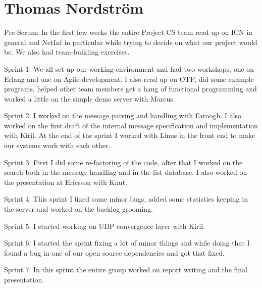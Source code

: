 \section{Thomas Nordstr\"om}

Pre-Scrum:
In the first few weeks the entire Project CS team read up on ICN in general and NetInf in particular while trying to decide on what our project would be. We also had team-building exercises.

Sprint 1:
We all set up our working environment and had two workshops, one on Erlang and one on Agile development. I also read up on OTP, did some example programs, helped other team members get a hang of functional programming and worked a little on the simple demo server with Marcus.

Sprint 2:
I worked on the message parsing and handling with Faroogh. I also worked on the first draft of the internal message specification and implementation with Kiril. At the end of the sprint I worked with Linus in the front end to make our systems work with each other.

Sprint 3:
First I did some re-factoring of the code, after that I worked on the search both in the message handling and in the list database. I also worked on the presentation at Ericsson with Knut.

Sprint 4:
This sprint I fixed some minor bugs, added some statistics keeping in the server and worked on the backlog grooming.

Sprint 5:
I started working on UDP convergence layer with Kiril.

Sprint 6:
I started the sprint fixing a lot of minor things and while doing that I found a bug in one of our open source  dependencies and got that fixed.

Sprint 7:
In this sprint the entire group worked on report writing and the final presentation.

